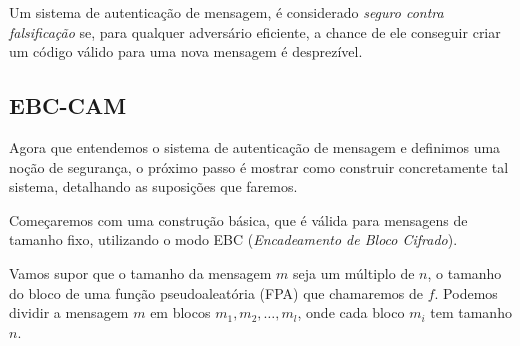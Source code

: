 \begin{center}
\end{center}

Um sistema de autenticação de mensagem, é considerado {\em seguro contra falsificação} se, para qualquer adversário eficiente, a chance de ele conseguir criar um código válido para uma nova mensagem é desprezível.

\subsection{EBC-CAM}
\label{sec:cbc-mac}

Agora que entendemos o sistema de autenticação de mensagem e definimos uma noção de segurança, o próximo passo é mostrar como construir concretamente tal sistema, detalhando as suposições que faremos.

Começaremos com uma construção básica, que é válida para mensagens de tamanho fixo, utilizando o modo EBC ({\em Encadeamento de Bloco Cifrado}).

Vamos supor que o tamanho da mensagem $m$ seja um múltiplo de $n$, o tamanho do bloco de uma função pseudoaleatória (FPA) que chamaremos de $f$.
Podemos dividir a mensagem $m$ em blocos $m_1, m_2, \dots, m_l$, onde cada bloco $m_i$ tem tamanho $n$.

